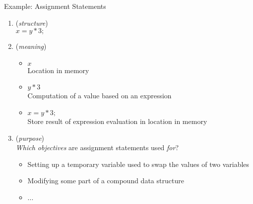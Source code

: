 \begin{csecframe}{Example: Assignment Statements}

    \begin{enumerate}
        \item {} (\textit{structure})\\
            $x = y * 3;$

        \item {} (\textit{meaning})\\
            \begin{itemize}
                \itemsep.1em
                \item $x$\\
                Location in memory

                \item $y * 3$\\
                Computation of a value based on an expression

                \item $x = y * 3;$\\
                Store result of expression evaluation in location in memory
            \end{itemize}

        \item {} (\textit{purpose})\\[3pt]
            \textit{Which objectives} are assignment statements used \textit{for}?\\
            \begin{itemize}
                \itemsep.1em
                \item Setting up a temporary variable used to swap the values of two variables

                \item Modifying some part of a compound data structure

                \item ...
            \end{itemize}

    \end{enumerate}

\end{csecframe}
